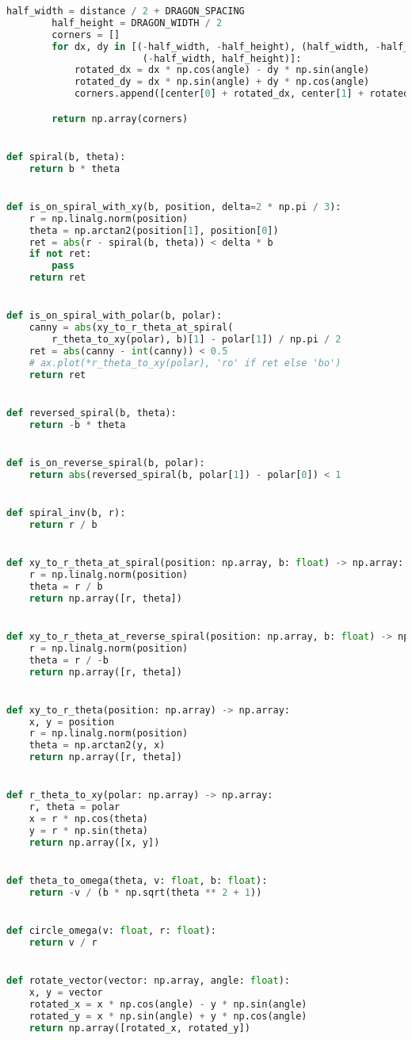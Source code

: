 \begin{lstlisting}[language=python]
        half_width = distance / 2 + DRAGON_SPACING
        half_height = DRAGON_WIDTH / 2
        corners = []
        for dx, dy in [(-half_width, -half_height), (half_width, -half_height), (half_width, half_height),
                        (-half_width, half_height)]:
            rotated_dx = dx * np.cos(angle) - dy * np.sin(angle)
            rotated_dy = dx * np.sin(angle) + dy * np.cos(angle)
            corners.append([center[0] + rotated_dx, center[1] + rotated_dy])

        return np.array(corners)


def spiral(b, theta):
    return b * theta


def is_on_spiral_with_xy(b, position, delta=2 * np.pi / 3):
    r = np.linalg.norm(position)
    theta = np.arctan2(position[1], position[0])
    ret = abs(r - spiral(b, theta)) < delta * b
    if not ret:
        pass
    return ret


def is_on_spiral_with_polar(b, polar):
    canny = abs(xy_to_r_theta_at_spiral(
        r_theta_to_xy(polar), b)[1] - polar[1]) / np.pi / 2
    ret = abs(canny - int(canny)) < 0.5
    # ax.plot(*r_theta_to_xy(polar), 'ro' if ret else 'bo')
    return ret


def reversed_spiral(b, theta):
    return -b * theta


def is_on_reverse_spiral(b, polar):
    return abs(reversed_spiral(b, polar[1]) - polar[0]) < 1


def spiral_inv(b, r):
    return r / b


def xy_to_r_theta_at_spiral(position: np.array, b: float) -> np.array:
    r = np.linalg.norm(position)
    theta = r / b
    return np.array([r, theta])


def xy_to_r_theta_at_reverse_spiral(position: np.array, b: float) -> np.array:
    r = np.linalg.norm(position)
    theta = r / -b
    return np.array([r, theta])


def xy_to_r_theta(position: np.array) -> np.array:
    x, y = position
    r = np.linalg.norm(position)
    theta = np.arctan2(y, x)
    return np.array([r, theta])


def r_theta_to_xy(polar: np.array) -> np.array:
    r, theta = polar
    x = r * np.cos(theta)
    y = r * np.sin(theta)
    return np.array([x, y])


def theta_to_omega(theta, v: float, b: float):
    return -v / (b * np.sqrt(theta ** 2 + 1))


def circle_omega(v: float, r: float):
    return v / r


def rotate_vector(vector: np.array, angle: float):
    x, y = vector
    rotated_x = x * np.cos(angle) - y * np.sin(angle)
    rotated_y = x * np.sin(angle) + y * np.cos(angle)
    return np.array([rotated_x, rotated_y])



\end{lstlisting}
